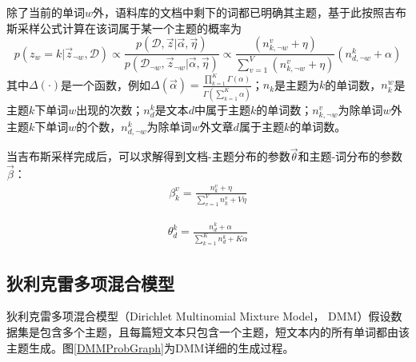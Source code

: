除了当前的单词$w$外，语料库的文档中剩下的词都已明确其主题，基于此按照吉布斯采样公式计算在该词属于某一个主题的概率为
\begin{equation} 
	p(z_w=k |\vec{z}_{\lnot w},\mathcal{D})   
	\propto  \frac{p(\mathcal{D},\vec{z} |\vec{\alpha},\vec{\eta})} 
					{p(\mathcal{D}_{\lnot w},\vec{z}_{\lnot w}|\vec{\alpha},\vec{\eta})} 
	\propto \frac{(n_{k,\lnot w}^v+\eta) }
					{\sum_{v=1}^V (n_{k,\lnot w}^v+\eta)} (n_{d,\lnot w}^k+\alpha)
\label{pzdLDA2}
\end{equation} 
其中$\Delta(\cdot)$是一个函数，例如$\Delta(\vec{\alpha}) = \frac{\prod_{k=1}^K\Gamma(\alpha)}{\Gamma(\sum_{k=1}^K \alpha)}$；$n_{k}$是主题为$k$的单词数，$n_{k}^{w}$是主题$k$下单词$w$出现的次数；$n_{d}^{k}$是文本$d$中属于主题$k$的单词数；$n_{k,\lnot w}^v$为除单词$w$外主题$k$下单词$w$的个数，$n_{d,\lnot w}^k$为除单词$w$外文章$d$属于主题$k$的单词数。

当吉布斯采样完成后，可以求解得到文档-主题分布的参数$\vec\theta$和主题-词分布的参数$\vec\beta$：
\begin{equation} 
	\begin{aligned}
	\beta_{k}^v = \frac{n_{k}^v + \eta}{\sum_{v=1}^V n_{k}^v + V\eta}
	\end{aligned}
\label{phizwLDA}
\end{equation}

\begin{equation} 
	\begin{aligned}
	\theta_{d}^k = \frac{n_{d}^k + \alpha}{\sum_{k=1}^K n_{d}^k + K \alpha}
	\end{aligned}
\label{thetadkLDA}
\end{equation}

\subsection{狄利克雷多项混合模型}
狄利克雷多项混合模型\cite{GSDMM}（Dirichlet Multinomial Mixture Model， DMM）假设数据集是包含多个主题，且每篇短文本只包含一个主题，短文本内的所有单词都由该主题生成。图\ref{DMMProbGraph}为DMM详细的生成过程。

